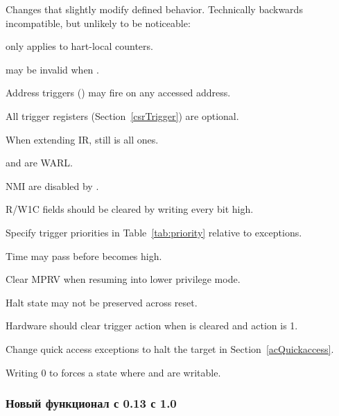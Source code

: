 \begin{steps}{Changes that slightly modify defined behavior. Technically backwards
incompatible, but unlikely to be noticeable:}
    \item \FcsrDcsrStopcount only applies to hart-local counters. 
    \item \FdmDmstatusVersion may be invalid when . 
    \item Address triggers (\RcsrMcontrol) may fire on any accessed address. 
    \item All trigger registers (Section~\ref{csrTrigger}) are optional. 
    \item When extending IR, \RdtmBypass still is all ones. 
    \item \FcsrDcsrEbreaks and \FcsrDcsrEbreaku are WARL. 
    \item NMI are disabled by \FcsrDcsrStepie. 
    \item R/W1C fields should be cleared by writing every bit high. 
    \item Specify trigger priorities in Table~\ref{tab:priority} relative to exceptions. 
    \item Time may pass before \FdmDmcontrolDmactive becomes high. 
    \item Clear MPRV when resuming into lower privilege mode. 
    \item Halt state may not be preserved across reset. 
    \item Hardware should clear trigger action when \FcsrTdataOneDmode is
        cleared and action is 1. 
    \item Change quick access exceptions to halt the target in
    Section~\ref{acQuickaccess}. 
    \item Writing 0 to \RcsrTdataOne forces a state where \RcsrTdataTwo and
        \RcsrTdataThree are writable. 
\end{steps}

\subsubsection{Новый функционал с 0.13 с 1.0}

